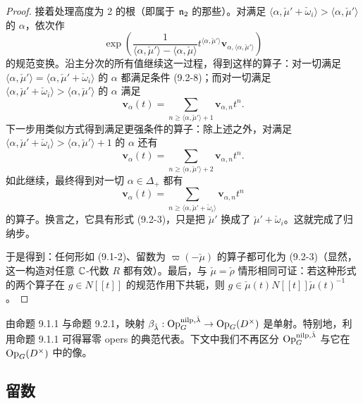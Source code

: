 \begin{proof}
接着处理高度为 2 的根（即属于 $\mathfrak{n}_2$ 的那些）。对满足 $\langle\alpha,\check\mu'+\check\omega_i\rangle>\langle\alpha,\check\mu'\rangle$ 的 $\alpha$，依次作
\[
\exp\left(\frac{1}{\langle\alpha,\check\mu'\rangle-\langle\alpha,\check\mu\rangle}t^{\langle\alpha,\check\mu'\rangle}\mathbf{v}_{\alpha,\langle\alpha,\check\mu'\rangle}\right)
\]
的规范变换。沿主分次的所有值继续这一过程，得到这样的算子：对一切满足 $\langle\alpha,\check\mu'\rangle = \langle\alpha,\check\mu'+\check\omega_i\rangle$ 的 $\alpha$ 都满足条件 (9.2-8)；而对一切满足 $\langle\alpha,\check\mu'+\check\omega_i\rangle>\langle\alpha,\check\mu'\rangle$ 的 $\alpha$ 满足
\[
\mathbf{v}_\alpha(t) = \sum_{n\ge\langle\alpha,\check\mu'\rangle+1}\mathbf{v}_{\alpha,n}t^n.
\]
下一步用类似方式得到满足更强条件的算子：除上述之外，对满足 $\langle\alpha,\check\mu'+\check\omega_i\rangle>\langle\alpha,\check\mu'\rangle+1$ 的 $\alpha$ 还有
\[
\mathbf{v}_\alpha(t) = \sum_{n\ge\langle\alpha,\check\mu'\rangle+2}\mathbf{v}_{\alpha,n}t^n.
\]
如此继续，最终得到对一切 $\alpha\in\Delta_+$ 都有
\[
\mathbf{v}_\alpha(t) = \sum_{n\ge\langle\alpha,\check\mu'+\check\omega_i\rangle}\mathbf{v}_{\alpha,n}t^n
\]
的算子。换言之，它具有形式 (9.2-3)，只是把 $\check\mu'$ 换成了 $\check\mu'+\check\omega_i$。这就完成了归纳步。

于是得到：任何形如 (9.1-2)、留数为 $\varpi(-\check\mu)$ 的算子都可化为 (9.2-3)（显然，这一构造对任意 $\mathbb{C}$-代数 $R$ 都有效）。最后，与 $\check\mu=\check\rho$ 情形相同可证：若这种形式的两个算子在 $g\in N[[t]]$ 的规范作用下共轭，则 $g\in\check\mu(t)N[[t]]\check\mu(t)^{-1}$。
\end{proof}

由命题 9.1.1 与命题 9.2.1，映射 $\beta_{\check\lambda}:\operatorname{Op}^{\mathrm{nilp},\check\lambda}_G\to\operatorname{Op}_G(D^\times)$ 是单射。特别地，利用命题 9.1.1 可得幂零 opers 的典范代表。下文中我们不再区分 $\operatorname{Op}^{\mathrm{nilp},\check\lambda}_G$ 与它在 $\operatorname{Op}_G(D^\times)$ 中的像。

\subsection{留数}


